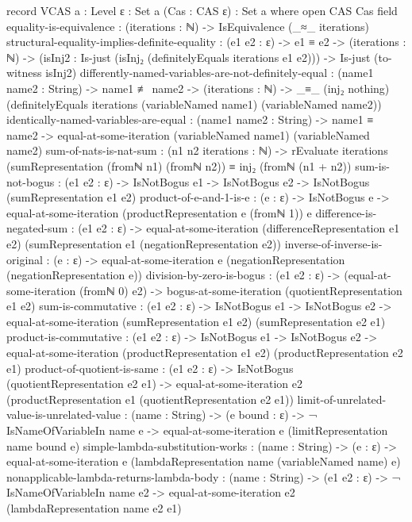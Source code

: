 \documentclass{report}
\begin{document}
\begin{code}
record VCAS {a : Level} {ε : Set a} (Cas : CAS ε) : Set a where
  open CAS Cas
  field
    equality-is-equivalence : (iterations : ℕ) -> IsEquivalence (_≈_ iterations)
    structural-equality-implies-definite-equality :
      (e1 e2 : ε) ->
      e1 ≡ e2 ->
      (iterations : ℕ) ->
      (isInj2 : Is-just (isInj₂ (definitelyEquals iterations e1 e2))) ->
      Is-just (to-witness isInj2)
    differently-named-variables-are-not-definitely-equal :
      (name1 name2 : String) ->
      name1 ≢ name2 ->
      (iterations : ℕ) ->
      _≡_ (inj₂ nothing)
          (definitelyEquals iterations
                            (variableNamed name1)
                            (variableNamed name2))
    identically-named-variables-are-equal :
      (name1 name2 : String) ->
      name1 ≡ name2 ->
      equal-at-some-iteration (variableNamed name1) (variableNamed name2)
    sum-of-nats-is-nat-sum :
      (n1 n2 iterations : ℕ) ->
      rEvaluate iterations (sumRepresentation (fromℕ n1) (fromℕ n2)) ≡
        inj₂ (fromℕ (n1 + n2))
    sum-is-not-bogus :
      (e1 e2 : ε) ->
      IsNotBogus e1 ->
      IsNotBogus e2 ->
      IsNotBogus (sumRepresentation e1 e2)
    product-of-e-and-1-is-e :
      (e : ε) ->
      IsNotBogus e ->
      equal-at-some-iteration (productRepresentation e (fromℕ 1)) e
    difference-is-negated-sum :
      (e1 e2 : ε) ->
      equal-at-some-iteration (differenceRepresentation e1 e2)
                              (sumRepresentation e1 (negationRepresentation e2))
    inverse-of-inverse-is-original :
      (e : ε) ->
      equal-at-some-iteration e (negationRepresentation (negationRepresentation e))
    division-by-zero-is-bogus :
      (e1 e2 : ε) ->
      (equal-at-some-iteration (fromℕ 0) e2) ->
      bogus-at-some-iteration (quotientRepresentation e1 e2)
    sum-is-commutative :
      (e1 e2 : ε) ->
      IsNotBogus e1 ->
      IsNotBogus e2 ->
      equal-at-some-iteration (sumRepresentation e1 e2)
                              (sumRepresentation e2 e1)
    product-is-commutative :
      (e1 e2 : ε) ->
      IsNotBogus e1 ->
      IsNotBogus e2 ->
      equal-at-some-iteration (productRepresentation e1 e2)
                              (productRepresentation e2 e1)
    product-of-quotient-is-same :
      (e1 e2 : ε) ->
      IsNotBogus (quotientRepresentation e2 e1) ->
      equal-at-some-iteration e2 (productRepresentation e1 (quotientRepresentation e2 e1))
    limit-of-unrelated-value-is-unrelated-value :
      (name : String) ->
      (e bound : ε) ->
      ¬ IsNameOfVariableIn name e ->
      equal-at-some-iteration e (limitRepresentation name bound e)
    simple-lambda-substitution-works :
      (name : String) ->
      (e : ε) ->
      equal-at-some-iteration e (lambdaRepresentation name (variableNamed name) e)
    nonapplicable-lambda-returns-lambda-body :
      (name : String) ->
      (e1 e2 : ε) ->
      ¬ IsNameOfVariableIn name e2 ->
      equal-at-some-iteration e2 (lambdaRepresentation name e2 e1)
\end{code}
\end{document}
